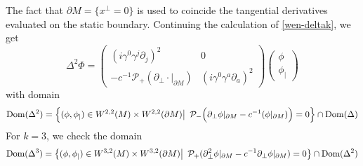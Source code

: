 The fact that $\partial M = \{x^\bot = 0\}$ is used to coincide the tangential derivatives evaluated on the static boundary.
Continuing the calculation of \cref{wen-deltak}, we get
\begin{equation}\label{wen-delta2}
\Delta^2 \Phi = \begin{pmatrix} (i \gamma^0 \gamma^j\partial_j)^2 & 0 \\ 
- c^{-1}\mathcal{P}_+( \partial_\bot \cdot\vert_{\partial M} ) & 
(i \gamma^0 \gamma^a \partial_a)^2 \end{pmatrix}
\begin{pmatrix} \phi \\ \phi_| \end{pmatrix}
\end{equation}
with domain 
\begin{equation*}
\mathrm{Dom}(\Delta^2) = \Big\{ (\phi, \phi_|) \in W^{2,2}(M)\times W^{2,2}(\partial M) \big\vert\enskip \mathcal{P}_- \Big(\partial_\bot\phi\vert_{\partial M} - c^{-1} (\phi\vert_{\partial M}) \Big) = 0 \Big\} \cap \mathrm{Dom}(\Delta)
\end{equation*}
For $k = 3$, 
we check the domain
\begin{equation*}
\mathrm{Dom}(\Delta^3) = \big\{ (\phi, \phi_|)\in W^{3,2}(M)\times W^{3,2}(\partial M) \big\vert \enskip \mathcal{P}_+(\partial_\bot^2 \phi\vert_{\partial M} - c^{-1}\partial_\bot \phi\vert_{\partial M} ) = 0 \big\} 
\cap \mathrm{Dom}(\Delta^2)
\end{equation*}
%
